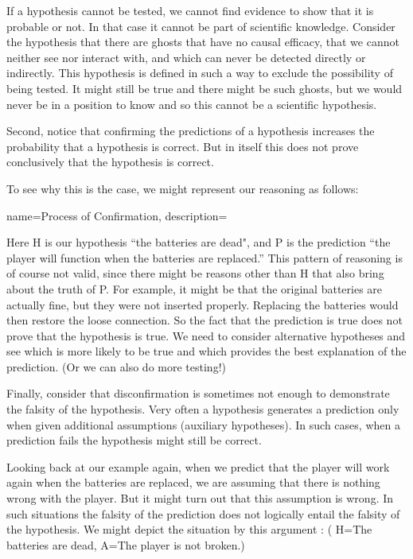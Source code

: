 If a hypothesis cannot be tested, we cannot find evidence to show that it is probable or not. In that case it cannot be part of scientific knowledge. Consider the hypothesis that there are ghosts that have no causal efficacy, that we cannot neither see nor interact with, and which can never be detected directly or indirectly. This hypothesis is defined in such a way to exclude the possibility of being tested. It might still be true and there might be such ghosts, but we would never be in a position to know and so this cannot be a scientific hypothesis.

Second, notice that confirming the predictions of a hypothesis increases the probability that a hypothesis is correct. But in itself this does not prove conclusively that the hypothesis is correct.

To see why this is the case, we might represent our reasoning as follows:

\begin{kormanize}
\end{kormanize}

{
name=Process of Confirmation,
description={}
}

Here H is our hypothesis ``the batteries are dead", and P is the prediction ``the player will function when the batteries are replaced.'' This pattern of reasoning is of course not valid, since there might be reasons other than H that also bring about the truth of P. For example, it might be that the original batteries are actually fine, but they were not inserted properly. Replacing the batteries would then restore the loose connection. So the fact that the prediction is true does not prove that the hypothesis is true. We need to consider alternative hypotheses and see which is more likely to be true and which provides the best explanation of the prediction. (Or we can also do more testing!)

Finally, consider that disconfirmation is sometimes not enough to demonstrate the falsity of the hypothesis. Very often a hypothesis generates a prediction only when given additional assumptions (auxiliary hypotheses). In such cases, when a prediction fails the hypothesis might still be correct.

Looking back at our example again, when we predict that the player will work again when the batteries are replaced, we are assuming that there is nothing wrong with the player. But it might turn out that this assumption is wrong. In such situations the falsity of the prediction does not logically entail the falsity of the hypothesis. We might depict the situation by this argument : ( H=The batteries are dead, A=The player is not broken.)

